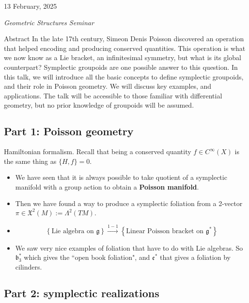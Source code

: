 \hfill{\large 13 February, 2025 

\hfill \textit{Geometric Structures Seminar}}
\vspace{2em}

\begin{thing4}{Abstract}
In the late 17th century, Simeon Denis Poisson discovered an operation that helped encoding and producing conserved quantities. This operation is what we now know as a Lie bracket, an infinitesimal symmetry, but what is its global counterpart? Symplectic groupoids are one possible answer to this question. In this talk, we will introduce all the basic concepts to define symplectic groupoids, and their role in Poisson geometry. We will discuss key examples, and applications. The talk will be accessible to those familiar with differential geometry, but no prior knowledge of groupoids will be assumed.  
\end{thing4}
\vspace{.5em}

\subsection{Part 1: Poisson geometry}

Hamiltonian formalism. Recall that being a conserved quantity \(f \in C^\infty(X)\) is the same thing as \(\{H,f\}=0\).

\begin{itemize}
\item We have seen that it is always possible to take quotient of a symplectic manifold with a group action to obtain a \textbf{Poisson manifold}.
\item Then we have found a way to produce a symplectic foliation from a 2-vector \(\pi \in \mathfrak{X}^2(M):=\Lambda^{2}(TM)\).
\item
	\begin{remark}\leavevmode
	\[\left\{ \text{Lie algebra on \(\mathfrak{g}\)} \right\} \xrightarrow{1-1}\left\{ \text{Linear Poisson bracket on \(\mathfrak{g}^*\)}  \right\}  \]
	\end{remark}
\item We saw very nice examples of foliation that have to do with Lie algebras. So \(\mathfrak{b}^*_3\) which gives the ``open book foliation", and \(\mathfrak{e}^*\) that gives a foliation by cilinders.
\end{itemize}

\subsection{Part 2: symplectic realizations}

